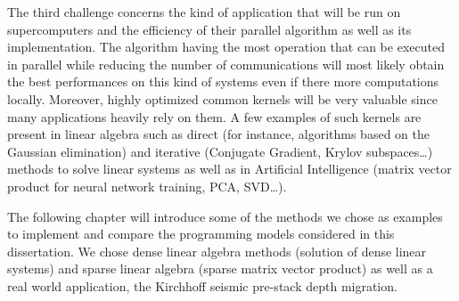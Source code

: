 The third challenge concerns the kind of application that will be run on supercomputers and the efficiency of their parallel algorithm as well as its implementation.
The algorithm having the most operation that can be executed in parallel while reducing the number of communications will most likely obtain the best performances on this kind of systems even if there more computations locally.
Moreover, highly optimized common kernels will be very valuable since many applications heavily rely on them.
A few examples of such kernels are present in linear algebra such as direct (for instance, algorithms based on the Gaussian elimination) and iterative (Conjugate Gradient, Krylov subspaces\dots) methods to solve linear systems as well as in Artificial Intelligence (matrix vector product for neural network training, PCA, SVD\dots).

The following chapter will introduce some of the methods we chose as examples to implement and compare the programming models considered in this dissertation.
We chose dense linear algebra methods (solution of dense linear systems) and sparse linear algebra (sparse matrix vector product) as well as a real world application, the Kirchhoff seismic pre-stack depth migration.
